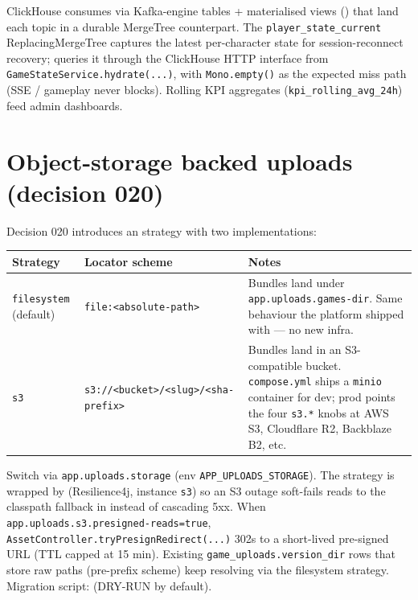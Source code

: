 \bigskip

ClickHouse consumes via Kafka-engine tables + materialised views
() that land
each topic in a durable MergeTree counterpart. The
\texttt{player\_state\_current} ReplacingMergeTree captures the latest
per-character state for session-reconnect recovery;
 queries it through the ClickHouse
HTTP interface from \texttt{GameStateService.hydrate(...)}, with
\texttt{Mono.empty()} as the expected miss path (SSE / gameplay never
blocks). Rolling KPI aggregates (\texttt{kpi\_rolling\_avg\_24h}) feed
admin dashboards.

\section{Object-storage backed uploads (decision 020)}

Decision 020 introduces an  strategy with two
implementations:

\begin{tabularx}{\linewidth}{l l X}
\toprule
\textbf{Strategy} & \textbf{Locator scheme} & \textbf{Notes} \\
\midrule
\texttt{filesystem} (default) & \texttt{file:<absolute-path>} & Bundles
land under \texttt{app.uploads.games-dir}. Same behaviour the platform
shipped with --- no new infra. \\
\texttt{s3} & \texttt{s3://<bucket>/<slug>/<sha-prefix>} & Bundles
land in an S3-compatible bucket. \texttt{compose.yml} ships a
\texttt{minio} container for dev; prod points the four \texttt{s3.*}
knobs at AWS S3, Cloudflare R2, Backblaze B2, etc. \\
\bottomrule
\end{tabularx}

\bigskip

Switch via \texttt{app.uploads.storage} (env
\texttt{APP\_UPLOADS\_STORAGE}). The strategy is wrapped by
 (Resilience4j, instance
\texttt{s3}) so an S3 outage soft-fails reads to the classpath fallback
in  instead of cascading 5xx. When
\texttt{app.uploads.s3.presigned-reads=true},
\texttt{AssetController.tryPresignRedirect(...)} 302s to a short-lived
pre-signed URL (TTL capped at 15 min). Existing
\texttt{game\_uploads.version\_dir} rows that store raw paths
(pre-prefix scheme) keep resolving via the filesystem strategy.
Migration script:  (DRY-RUN by
default).

